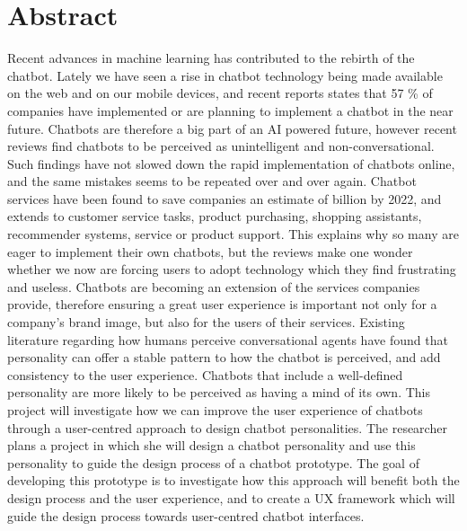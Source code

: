 \chapter*{Abstract}

Recent advances in machine learning has contributed to the rebirth of the chatbot. Lately we have seen a rise in chatbot technology being made available on the web and on our mobile devices, and recent reports states that 57 \% of companies have implemented or are planning to implement a chatbot in the near future. Chatbots are therefore a big part of an AI powered future, however recent reviews find chatbots to be perceived as unintelligent and non-conversational. Such findings have not slowed down the rapid implementation of chatbots online, and the same mistakes seems to be repeated over and over again. Chatbot services have been found to save companies an estimate of  billion by 2022, and extends to customer service tasks, product purchasing, shopping assistants, recommender systems, service or product support. This explains why so many are eager to implement their own chatbots, but the reviews make one wonder whether we now are forcing users to adopt technology which they find frustrating and useless. Chatbots are becoming an extension of the services companies provide, therefore ensuring a great user experience is important not only for a company's brand image, but also for the users of their services. Existing literature regarding how humans perceive conversational agents have found that personality can offer a stable pattern to how the chatbot is perceived, and add consistency to the user experience. Chatbots that include a well-defined personality are more likely to be perceived as having a mind of its own. This project will investigate how we can improve the user experience of chatbots through a user-centred approach to design chatbot personalities. The researcher plans a project in which she will design a chatbot personality and use this personality to guide the design process of a chatbot prototype. The goal of developing this prototype is to investigate how this approach will benefit both the design process and the user experience, and to create a UX framework which will guide the design process towards user-centred chatbot interfaces.

\hypersetup{pageanchor=false}